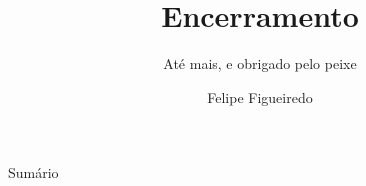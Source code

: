 \documentclass{beamer}
\title[Encerramento] %
{Encerramento}
\subtitle
{Até mais, e obrigado pelo peixe} %
\author%
{Felipe Figueiredo}%
\institute[] %
{
}
\date%
{}
\begin{document}
\begin{frame}
  \titlepage
\end{frame}

\begin{frame}{Sumário}
  \tableofcontents
\end{frame}







\end{document}
